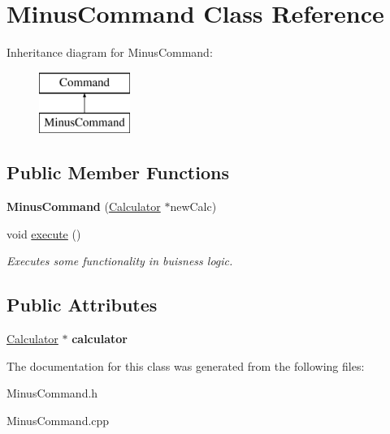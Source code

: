 \hypertarget{class_minus_command}{}\section{Minus\+Command Class Reference}
\label{class_minus_command}
Inheritance diagram for Minus\+Command\+:\begin{figure}[H]
\begin{center}
\leavevmode
\includegraphics[height=2.000000cm]{class_minus_command}
\end{center}
\end{figure}
\subsection*{Public Member Functions}
\begin{DoxyCompactItemize}
\item 
\hypertarget{class_minus_command_a9304469f5f5baa79902bd21e81fb3526}{}{\bfseries Minus\+Command} (\hyperlink{class_calculator}{Calculator} $\ast$new\+Calc)\label{class_minus_command_a9304469f5f5baa79902bd21e81fb3526}

\item 
\hypertarget{class_minus_command_a117f4a7fb5f380d968e057ee9efad956}{}void \hyperlink{class_minus_command_a117f4a7fb5f380d968e057ee9efad956}{execute} ()\label{class_minus_command_a117f4a7fb5f380d968e057ee9efad956}

\begin{DoxyCompactList}\small\item\em Executes some functionality in buisness logic. \end{DoxyCompactList}\end{DoxyCompactItemize}
\subsection*{Public Attributes}
\begin{DoxyCompactItemize}
\item 
\hypertarget{class_minus_command_a659a458964a22955e73022f23c8a2f7e}{}\hyperlink{class_calculator}{Calculator} $\ast$ {\bfseries calculator}\label{class_minus_command_a659a458964a22955e73022f23c8a2f7e}

\end{DoxyCompactItemize}


The documentation for this class was generated from the following files\+:\begin{DoxyCompactItemize}
\item 
Minus\+Command.\+h\item 
Minus\+Command.\+cpp\end{DoxyCompactItemize}
